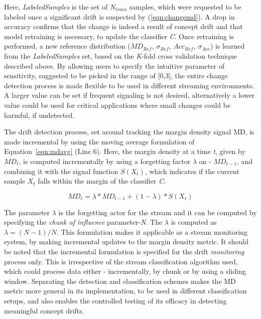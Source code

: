 \documentclass[authoryear,3p,times,twocolumn]{elsarticle}
\begin{document}
Here, \textit{LabeledSamples} is the set of $N_{train}$ samples, which were requested to be labeled once a significant drift is suspected by (\ref{eqn:changemd}). A drop in accuracy confirms that the change is indeed a result of concept drift and that model retraining is necessary, to update the classifier \textit{C}. Once retraining is performed, a new reference distribution ($MD_{Ref}$, $\sigma_{Ref}$, $Acc_{Ref}$, $\sigma_{Acc}$) is learned from the \textit{LabeledSamples} set, based on the \textit{K}-fold cross validation technique described above. By allowing users to specify the intuitive parameter of sensitivity, suggested to be picked in the range of [0,3], the entire change detection process is made flexible to be used in different streaming environments. A larger value can be set if frequent signaling is not desired, alternatively a lower value could be used for critical applications where small changes could be harmful, if undetected.

The drift detection process, set around tracking the margin density signal MD, is made incremental by using the moving average formulation of Equation~\ref{eqn:mdavg} (Line 6). Here, the margin density at a time \textit{t}, given by $MD_t$, is computed incrementally by using a forgetting factor $\lambda$ on - $MD_{t-1}$, and combining it with the signal function $S(X_t)$, which indicates if the current sample $X_t$ falls within the margin of the classifier \textit{C}. 

\begin{equation}
\label{eqn:mdavg}
MD_t = \lambda*MD_{t-1} +(1-\lambda)*S(X_t)
\end{equation}

The parameter $\lambda$ is the forgetting actor for the stream and it can be computed by specifying the \textit{chunk of influence} parameter-\textit{N}. The $\lambda$ is computed as $\lambda=(N-1)/N$. This formulation makes it applicable as a stream monitoring system, by making incremental updates to the margin density metric. It should be noted that the incremental formulation is specified for the drift \textit{monitoring} process only. This is irrespective of the stream classification algorithm used, which could process data either - incrementally, by chunk or by using a sliding window. Separating the detection and classification schemes makes the MD metric more general in its implementation, to be used in different classification setups, and also enables the controlled testing of its efficacy in detecting meaningful concept drifts.
\end{document}
